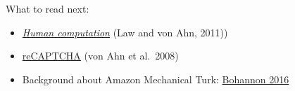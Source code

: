 \documentclass[aspectratio=169]{beamer}
\begin{document}
\begin{frame}

What to read next:
\begin{itemize}
\item \href{https://dl.acm.org/doi/book/10.5555/2049960}{\textit{Human computation}} (Law and von Ahn, 2011))
\item \href{https://dx.doi.org/10.1126/science.1160379}{reCAPTCHA} (von Ahn et al.\ 2008) 
\item Background about Amazon Mechanical Turk: \href{https://dx.doi.org/10.1126/science.352.6291.1263}{Bohannon 2016}
\end{itemize}

\end{frame}
\frame{\titlepage}
\end{document}
